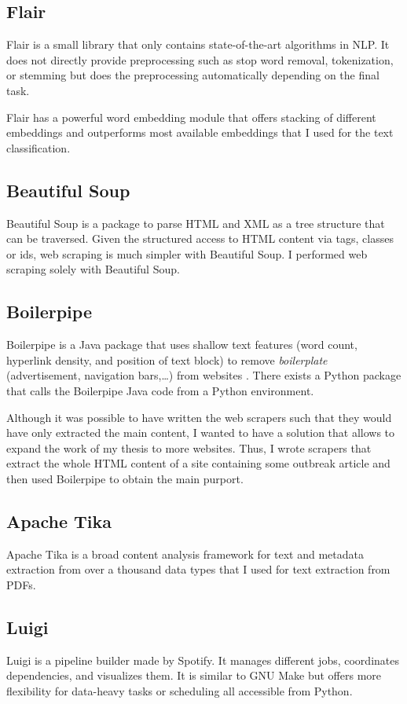 \subsection{Flair}
  Flair is a small library that only contains state-of-the-art algorithms in NLP.
  It does not directly provide preprocessing such as stop word removal, tokenization, or stemming but does the preprocessing automatically depending on the final task.

  Flair has a powerful word embedding module that offers stacking of different embeddings and outperforms most available embeddings that I used for the text classification.

\subsection{Beautiful Soup}
  Beautiful Soup is a package to parse HTML and XML as a tree structure that can be traversed.
  Given the structured access to HTML content via tags, classes or ids, web scraping is much simpler with Beautiful Soup.
  I performed web scraping solely with Beautiful Soup.

\subsection{Boilerpipe}
  Boilerpipe is a Java package that uses shallow text features (word count, hyperlink density, and position of text block) to remove \emph{boilerplate} (advertisement, navigation bars,\dots) from websites \citep{Kohlschutter2010}.
  There exists a Python package that calls the Boilerpipe Java code from a Python environment.

  Although it was possible to have written the web scrapers such that they would have only extracted the main content, I wanted to have a solution that allows to expand the work of my thesis to more websites.
  Thus, I wrote scrapers that extract the whole HTML content of a site containing some outbreak article and then used Boilerpipe to obtain the main purport.

\subsection{Apache Tika}\label{Tika}
  Apache Tika is a broad content analysis framework for text and metadata extraction from over a thousand data types that I used for text extraction from PDFs.

\subsection{Luigi}
  Luigi is a pipeline builder made by Spotify.
  It manages different jobs, coordinates dependencies, and visualizes them.
  It is similar to GNU Make but offers more flexibility for data-heavy tasks or scheduling all accessible from Python.

